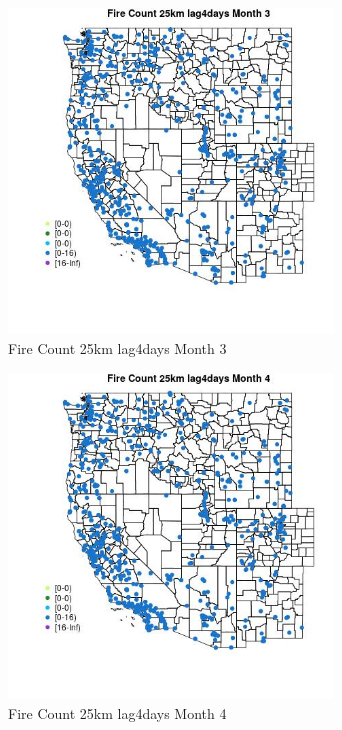 \begin{figure} 
\centering  
\includegraphics[width=0.77\textwidth]{Code_Outputs/Report_ML_input_PM25_Step4_part_e_de_duplicated_aves_compiled_2019-05-21wNAs_MapObsMo3Fire_Count_25km_lag4days.jpg} 
\caption{\label{fig:Report_ML_input_PM25_Step4_part_e_de_duplicated_aves_compiled_2019-05-21wNAsMapObsMo3Fire_Count_25km_lag4days}Fire Count 25km lag4days Month 3} 
\end{figure} 
 

\begin{figure} 
\centering  
\includegraphics[width=0.77\textwidth]{Code_Outputs/Report_ML_input_PM25_Step4_part_e_de_duplicated_aves_compiled_2019-05-21wNAs_MapObsMo4Fire_Count_25km_lag4days.jpg} 
\caption{\label{fig:Report_ML_input_PM25_Step4_part_e_de_duplicated_aves_compiled_2019-05-21wNAsMapObsMo4Fire_Count_25km_lag4days}Fire Count 25km lag4days Month 4} 
\end{figure} 
 

